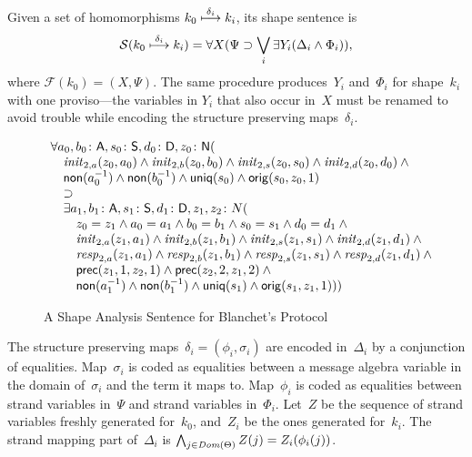 \documentclass[12pt]{report}
\theoremstyle{definition}
\newcommand{\sdom}{\fn{Dom}}
\newcommand{\init}{\fn{init}}
\newcommand{\resp}{\fn{resp}}
\newcommand{\form}{\mathcal{F}}
\newcommand{\sent}{\mathcal{S}}
\begin{document}
Given a set of homomorphisms $k_0\stackrel{\delta_i}{\longmapsto}k_i$, its shape
sentence is
\begin{equation}
\sent(k_0\homomorphism{\delta_i}k_i)=\all{X}(\Psi\supset
\bigvee_i\some{Y_i}(\Delta_i\wedge\Phi_i)),\label{eq:shape sentence}
\end{equation}
where $\form(k_0)=(X,\Psi)$.  The same procedure produces~$Y_i$
and~$\Phi_i$ for shape~$k_i$ with one proviso---the variables in
$Y_i$ that also occur in~$X$ must be renamed to avoid trouble while
encoding the structure preserving maps~$\delta_i$.

\begin{figure}
$$\begin{array}{l}
\all{a_0,b_0\colon\srt{A}, s_0\colon\srt{S}, d_0\colon\srt{D}, z_0\colon\srt{N}}(\\
\quad\init_{2,a}(z_0,a_0)\wedge
\init_{2,b}(z_0,b_0)\wedge
\init_{2,s}(z_0,s_0)\wedge
\init_{2,d}(z_0,d_0)\wedge{}\\
\quad\cn{non}(a_0^{-1})\wedge
\cn{non}(b_0^{-1})\wedge
\cn{uniq}(s_0)\wedge\cn{orig}(s_0,z_0,1)\\
\quad\supset\\
\quad\some{a_1,b_1\colon\srt{A}, s_1\colon\srt{S}, d_1\colon\srt{D}, z_1,z_2\colon
  N}(\\
\qquad z_0=z_1\wedge a_0=a_1\wedge b_0=b_1\wedge s_0=s_1\wedge d_0=d_1\wedge{}\\
\qquad\init_{2,a}(z_1,a_1)\wedge
\init_{2,b}(z_1,b_1)\wedge
\init_{2,s}(z_1,s_1)\wedge
\init_{2,d}(z_1,d_1)\wedge{}\\
\qquad\resp_{2,a}(z_1,a_1)\wedge
\resp_{2,b}(z_1,b_1)\wedge
\resp_{2,s}(z_1,s_1)\wedge
\resp_{2,d}(z_1,d_1)\wedge{}\\
\qquad\cn{prec}(z_1,1,z_2,1)\wedge
\cn{prec}(z_2,2,z_1,2)\wedge{}\\
\qquad\cn{non}(a_1^{-1})\wedge
\cn{non}(b_1^{-1})\wedge
\cn{uniq}(s_1)\wedge\cn{orig}(s_1,z_1,1)))
\end{array}$$
\caption{A Shape Analysis Sentence for Blanchet's
  Protocol}\label{fig:blanchet's shape analysis sentence}
\end{figure}

The structure preserving maps~$\delta_i=(\phi_i,\sigma_i)$ are encoded
in~$\Delta_i$ by a conjunction of equalities.  Map~$\sigma_i$ is coded
as equalities between a message algebra variable in the domain
of~$\sigma_i$ and the term it maps to.  Map~$\phi_i$ is coded as
equalities between strand variables in~$\Psi$ and strand variables
in~$\Phi_i$.  Let~$Z$ be the sequence of strand variables freshly
generated for~$k_0$, and~$Z_i$ be the ones generated for~$k_i$.  The
strand mapping part of~$\Delta_i$ is
$\bigwedge_{j\in\sdom(\Theta)}Z(j)=Z_i(\phi_i(j))$.
\end{document}
